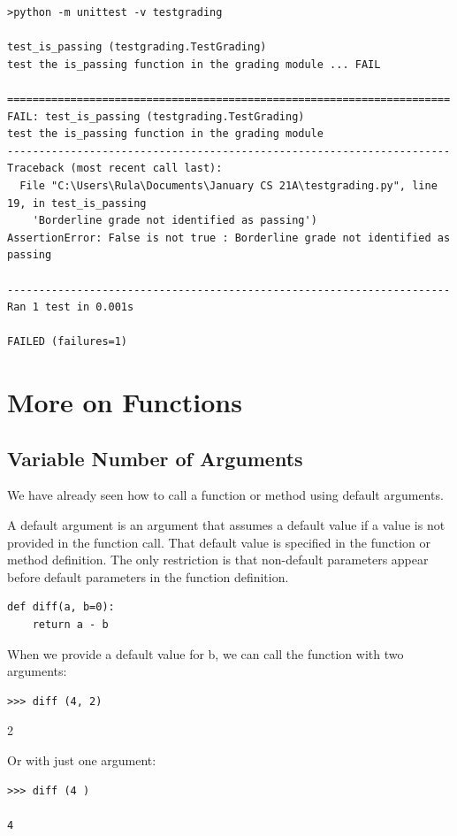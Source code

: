 \documentclass{article}
\begin{document}
 \begin{lstlisting}
>python -m unittest -v testgrading
 
test_is_passing (testgrading.TestGrading)
test the is_passing function in the grading module ... FAIL
 
======================================================================
FAIL: test_is_passing (testgrading.TestGrading)
test the is_passing function in the grading module
----------------------------------------------------------------------
Traceback (most recent call last):
  File "C:\Users\Rula\Documents\January CS 21A\testgrading.py", line 19, in test_is_passing
    'Borderline grade not identified as passing')
AssertionError: False is not true : Borderline grade not identified as passing
 
----------------------------------------------------------------------
Ran 1 test in 0.001s
 
FAILED (failures=1)
\end{lstlisting}

\section{More on Functions}
\subsection{Variable Number of Arguments}
We have already seen how to call a function or method using default arguments.

A default argument is an argument that assumes a default value if a value is not provided in the function call.  That default value is specified in the function or method definition.  The only restriction is that non-default parameters appear before default parameters in the function definition. 

\begin{lstlisting}
def diff(a, b=0):  
    return a - b 
\end{lstlisting}
     
When we provide a default value for b, we can call the function with two arguments:

\begin{lstlisting}
>>> diff (4, 2)
\end{lstlisting}

2

Or with just one argument:

\begin{lstlisting}
>>> diff (4 )

4
\end{lstlisting}
\end{document}

